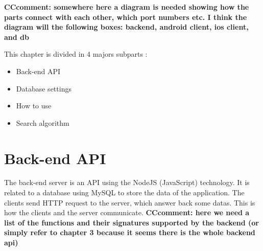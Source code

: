 {\bf CCcomment: somewhere here a diagram is needed showing how the parts connect with each other, which port numbers etc. I think the diagram will the following boxes: backend, android client, ios client, and db}

This chapter is divided in 4 majors subparts :
\begin{itemize}
    \item Back-end API
    \item Database settings
    \item How to use
    \item Search algorithm
\end{itemize}

\section{Back-end API}
The back-end server is an API using the NodeJS (JavaScript) technology. It is related to a database using MySQL to store the data of the application. The clients send HTTP request to the server, which answer back some datas. This is how the clients and the server communicate.
{\bf CCcomment: here we need a list of the functions and their signatures supported by the backend (or simply refer to chapter 3 because it seems there is the whole backend api)}


